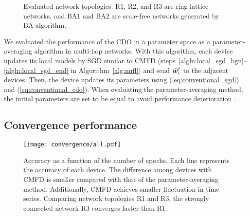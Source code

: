 \documentclass[journal]{IEEEtran}
\begin{document}
\begin{figure}[!t]
  \centering
  \caption{Evaluated network topologies. R1, R2, and R3 are ring lattice networks, and BA1 and BA2 are scale-free networks generated by BA algorithm.}
  \label{fig:topologies}
\end{figure}

We evaluated the performance of the \gls{CDO} in a parameter space
as a parameter-averaging algorithm in multi-hop networks.
With this algorithm, each device updates its local models by \gls{SGD}
similar to \gls{CMFD} (steps~\ref{algln:local_sgd_bgn}--\ref{algln:local_sgd_end} in Algorithm~\ref{alg:nnfl})
and send ${\hat{\bm{w}}_{i}}^t$ to the adjacent devices.
Then, the device updates its parameters using (\ref{eq:conventional_sgd}) and (\ref{eq:conventional_cdo}).
When evaluating the parameter-averaging method, the initial parameters are set to be equal
to avoid performance deterioration \cite{mcmahan2016communication}.

\subsection{Convergence performance}
\begin{figure}[!t]
\centering
\texttt{[image: convergence/all.pdf]}
\caption{Accuracy as a function of the number of epochs.
Each line represents the accuracy of each device.
The difference among devices with \gls{CMFD} is smaller compared with that of the parameter-averaging method.
Additionally, \gls{CMFD} achieves smaller fluctuation in time series.
Comparing network topologies R1 and R3, the strongly connected network R3 converges faster than R1.
}
\label{fig:eval_epoch2acc}
\end{figure}
\end{document}
